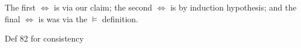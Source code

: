\documentclass[a4paper]{article}
\begin{document}
\begin{enumerate}
\begin{itemize}
    The first $\Leftrightarrow$ is via our claim; the second $\Leftrightarrow$ is by induction hypothesis; and the final $\Leftrightarrow$ is was via the $\models$ definition.



\end{itemize}




Def 82 for consistency


\end{enumerate}
\end{document}
